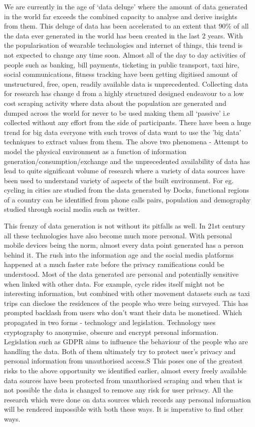 We are currently in the age of `data deluge' where the amount of data generated in the world far exceeds the combined capacity to analyse and derive insights from them.
This deluge of data has been accelerated to an extent that 90\% of all the data ever generated in the world has been created in the last 2 years.
With the popularisation of wearable technologies and internet of things, this trend is not expected to change any time soon.
Almost all of the day to day activities of people such as banking, bill payments, ticketing in public transport, taxi hire, social communications, fitness tracking have been getting digitised  amount of unstructured, free, open, readily available data is unprecedented.
Collecting data for research has change d from a highly structured designed endeavour to  a low cost scraping activity where data about the population are generated and dumped across the world for never to be used making them all `passive' i.e collected without any effort from the side of participants.
There have been a huge trend for big data everyone with such troves of data want to use the 'big data' techniques to extract values from them.
The above two phenomena - Attempt to model the physical environment as a function of information generation/consumption/exchange and the unprecedented availability of data has lead to quite significant volume of research where a variety of data sources have been used to understand variety of aspects of the built environment.
For eg. cycling in cities are studied from the data generated by Docks, functional regions of a country can be identified from phone calls pairs, population and demography studied through social media such as twitter. 

This frenzy of data generation is not without its pitfalls as well. 
In 21st century all these technologies have also become much more personal.
With personal mobile devices being the norm, almost every data point generated has a person behind it.
The rush into the information age and the social media platforms happened at a much faster rate before the privacy ramifications could be understood.
Most of the data generated are personal and potentially sensitive when linked with other data.
For example, cycle rides itself might not be interesting information, but combined with other movement datasets such as taxi trips can disclose the residences of the people who were being surveyed.
This has prompted backlash from users who don't want their data be monetised.
Which propagated in two forms - technology and legislation.
Technology uses cryptography to anonymise, obscure and encrypt personal information. Legislation such as GDPR aims to influence the behaviour of the people who are handling the data. 
Both of them ultimately try to protect user's privacy and personal information from unauthorised access.S
This poses one of the  greatest risks to the above opportunity we identified earlier, almost every freely available data sources have been protected from unauthorised scraping and when that is not possible the data is changed to remove any risk for user privacy.
All the research which were done on data sources which records any personal information will be rendered impossible with both these ways.
It is imperative to find other ways.

